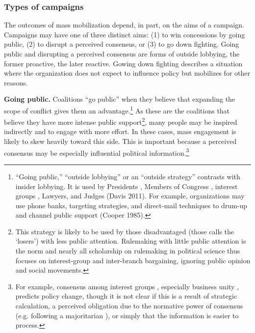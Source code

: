 \subsubsection{Types of campaigns} The outcomes of mass mobilization depend, in part, on the aims of a campaign. Campaigns may have one of three distinct aims: (1) to win concessions by going public, (2) to disrupt a perceived consensus, or (3) to go down fighting. Going public and disrupting a perceived consensus are forms of outside lobbying, the former proactive, the later reactive. Gowing down fighting describes a situation where the organization does not expect to influence policy but mobilizes for other reasons. 

\textbf{Going public.} Coalitions ``go public'' when they believe that expanding the scope of conflict gives them an advantage.\footnote{
``Going public,'' ``outside lobbying'' or an ``outside strategy'' contrasts with insider lobbying. It is used by Presidents \citep{Kernell2007}, Members of Congress \citep{Malecha2012}, interest groups \citep{Walker1991, Dur2013}, Lawyers, and Judges (Davis 2011). 
For example, organizations may use phone banks, targeting strategies, and direct-mail techniques to drum-up and channel public support (Cooper 1985).
}
As these are the coalitions that believe they have more intense public support\footnote{
This strategy is likely to be used by those disadvantaged (those \citet{Schattschneider1975} calls the `losers') with less public attention.
Rulemaking with little public attention is the norm and nearly all scholarship on rulemaking in political science thus focuses on interest-group and inter-branch bargaining, ignoring public opinion and social movements.}, many people may be inspired indirectly and to engage with more effort. In these cases, mass engagement is likely to skew heavily toward this side. This is important because a perceived consensus may be especially influential political information.\footnote{
For example, consensus among interest groups \citep{Golden1998, Yackee2006JPART}, especially business unity \citep{Yackee2006JOP, Haeder2015}, predicts policy change, though it is not clear if this is a result of strategic calculation, a perceived obligation due to the normative power of consensus (e.g. following a majoritarian \citep{Mendelson2011}), or simply that the information is easier to process.
}

